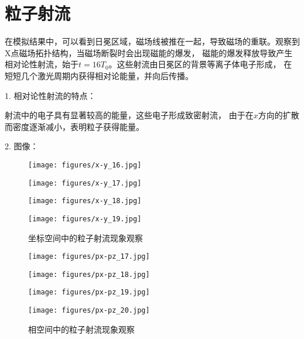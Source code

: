\section[\textnormal{粒子射流}]{\textbf{粒子射流}}

在模拟结果中，可以看到日冕区域，磁场线被推在一起，导致磁场的重联。观察到X点磁场拓扑结构，当磁场断裂时会出现磁能的爆发，
磁能的爆发释放导致产生相对论性射流，始于$t=16T_0$。这些射流由日冕区的背景等离子体电子形成，
在短短几个激光周期内获得相对论能量，并向后传播\cite{Yi_2018}。

1. 相对论性射流的特点：

射流中的电子具有显著较高的能量，这些电子形成致密射流，
由于在$x$方向的扩散而密度逐渐减小，表明粒子获得能量。

2. 图像：

\begin{figure}[H]
    \begin{minipage}[t]{0.5\linewidth}
        \centering
        \texttt{[image: figures/x-y\_16.jpg]}
        \label{fig:side_xy:a}
    \end{minipage}%
    \begin{minipage}[t]{0.5\linewidth}
        \centering
        \texttt{[image: figures/x-y\_17.jpg]}
        \label{fig:side_xy:b}
    \end{minipage}
    \begin{minipage}[t]{0.5\linewidth}
        \centering
        \texttt{[image: figures/x-y\_18.jpg]}
        \label{fig:side_xy:c}
    \end{minipage}%
    \begin{minipage}[t]{0.5\linewidth}
        \centering
        \texttt{[image: figures/x-y\_19.jpg]}
        \label{fig:side_xy:d}
    \end{minipage}
    \caption{坐标空间中的粒子射流现象观察}
    \label{fig:combined_xy}

\end{figure}

\begin{figure}[H]
    \begin{minipage}[t]{0.5\linewidth}
        \centering
        \texttt{[image: figures/px-pz\_17.jpg]}
        \label{fig:side_pxz:a}
    \end{minipage}%
    \begin{minipage}[t]{0.5\linewidth}
        \centering
        \texttt{[image: figures/px-pz\_18.jpg]}
        \label{fig:side_pxz:b}
    \end{minipage}
    \begin{minipage}[t]{0.5\linewidth}
        \centering
        \texttt{[image: figures/px-pz\_19.jpg]}
        \label{fig:side_pxz:c}
    \end{minipage}%
    \begin{minipage}[t]{0.5\linewidth}
        \centering
        \texttt{[image: figures/px-pz\_20.jpg]}
        \label{fig:side_pxz:d}
    \end{minipage}
    \caption{相空间中的粒子射流现象观察}
    \label{fig:combined_pxz}

\end{figure}

